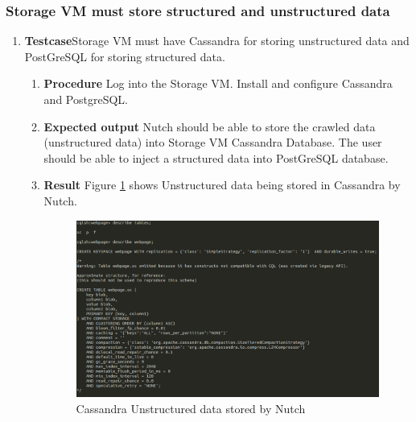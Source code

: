 \subsubsection{Storage VM must store structured and unstructured data}
\begin{enumerate}
\item \textbf{Testcase}\newline Storage VM must have Cassandra for
  storing unstructured data and PostGreSQL for storing structured data.
  \begin{enumerate}[label={}]
  \item \textbf{Procedure}\newline
    Log into the Storage VM. Install and configure Cassandra and
    PostgreSQL.
  \item \textbf{Expected output}\newline
    Nutch should be able to store the crawled data (unstructured data)
    into Storage VM Cassandra Database. The user should be able to
    inject a structured data into PostGreSQL database.
  \item \textbf{Result}\newline
    Figure \ref{nutch-cassandra} shows Unstructured data being stored
    in Cassandra by Nutch.
    \begin{figure}
      \centering
      \includegraphics[scale=0.4]{screenshots/nutch-cassandra.png}
      \caption{Cassandra Unstructured data stored by Nutch}
      \label{nutch-cassandra}
    \end{figure}
  \end{enumerate}
\end{enumerate}


